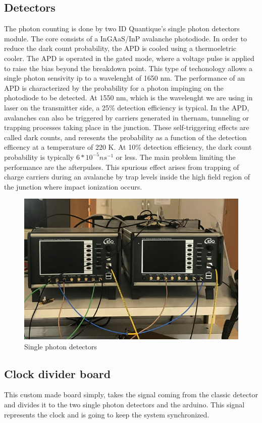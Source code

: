 \begin{refsection}
		
		\subsection{Detectors}
		The photon counting is done by two ID Quantique's single photon detectors module. The core consists of a InGAaS/InP avalanche photodiode. In order to reduce the dark count probability, the APD is cooled using a thermoeletric cooler. The APD is operated in the gated mode, where a voltage pulse is applied to raise the bias beyond the breakdown point. This type of techonology allows a single photon sensivity ip to a wavelenght of 1650 nm. The performance of an APD is characterized by the probability for a photon impinging on the photodiode to be detected. At 1550 nm, which is the wavelenght we are using in laser on the transmitter side, a 25\% detection efficiency is typical. In the APD, avalanches can also be triggered by carriers generated in thernam, tunneling or trapping processes taking place in the junction. These  self-triggering effects are called dark counts, and reresents the probability as a function of the detection efficency at a temperature of 220 K. At 10\% detection efficiency, the dark count probability is typically  $6* 10^{-5} ns^{-1}$ or less. The main problem limiting the performance are the afterpulses. This spurious effect arises from trapping of  charge carriers during an avalanche by trap levels inside the high field region of the junction where impact ionization occurs.
		
		\begin{figure}[H]
			\centering
			\includegraphics[width=0.8\linewidth]{./sdf/arduino_quantum_rx/figures/detectors.PNG}
			\caption{Single photon detectors}
			\label{fig:arduino}
		\end{figure}
		
		
		
		\subsection{Clock divider board}
		This custom made board simply, takes the signal coming from the classic detector and divides it to the two single photon detectors and the arduino. This signal represents the clock and is going to keep the system synchronized.
		

\end{refsection}
